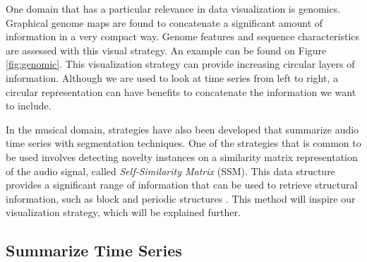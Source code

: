 One domain that has a particular relevance in data visualization is genomics. Graphical genome maps are found to concatenate a significant amount of information in a very compact way. Genome features and sequence characteristics are assessed with this visual strategy. An example can be found on Figure \ref{fig:genomic}. This visualization strategy can provide increasing circular layers of information. Although we are used to look at time series from left to right, a circular representation can have benefits to concatenate the information we want to include.
\par
In the musical domain, strategies have also been developed that summarize audio time series with segmentation techniques. One of the strategies that is common to be used involves detecting novelty instances on a similarity matrix representation of the audio signal, called \textit{Self-Similarity Matrix} (SSM). This data structure provides a significant range of information that can be used to retrieve structural information, such as block and periodic structures \cite{fmp1, fmp2, audiolabs1, audiolabs2}. This method will inspire our visualization strategy, which will be explained further.

\subsection{Summarize Time Series}






